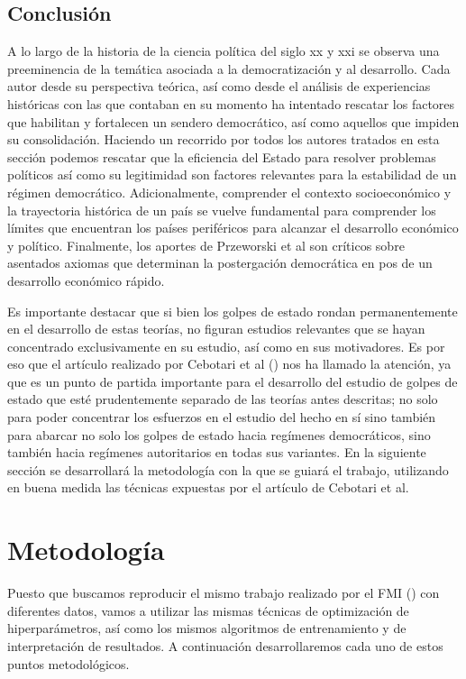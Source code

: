 \documentclass{article}
\begin{document}
\subsection{Conclusión}
A lo largo de la historia de la ciencia política del siglo xx y xxi se observa una
preeminencia de la temática asociada a la democratización y al desarrollo. Cada autor
desde su perspectiva teórica, así como desde el análisis de experiencias históricas con las 
que contaban en su momento ha intentado
rescatar los factores que habilitan y fortalecen un sendero democrático, así como aquellos
que impiden su consolidación. Haciendo un recorrido por todos los autores tratados en esta
sección podemos rescatar que la eficiencia del Estado para resolver problemas políticos así
como su legitimidad son factores relevantes para la estabilidad de un régimen democrático.
Adicionalmente, comprender el contexto socioeconómico y la trayectoria histórica de un país
se vuelve fundamental para comprender los límites que encuentran los países periféricos para
alcanzar el desarrollo económico y político. Finalmente, los aportes de Przeworski et al
son críticos sobre asentados axiomas que determinan la postergación democrática en pos de un 
desarrollo económico rápido.

Es importante destacar que si bien los golpes de estado rondan permanentemente
en el desarrollo de estas teorías, no figuran estudios relevantes que se hayan concentrado
exclusivamente en su estudio, así como en sus motivadores. Es por eso que el artículo
realizado por Cebotari et al (\citeyear{Ceb24}) nos ha llamado la atención, ya que es un
punto de partida importante para el desarrollo del estudio de golpes de estado que esté
prudentemente separado de las teorías antes descritas; no solo para poder concentrar los
esfuerzos en el estudio del hecho en sí sino también para abarcar no solo los golpes de
estado hacia regímenes democráticos, sino también hacia regímenes autoritarios en todas
sus variantes. En la siguiente sección se desarrollará la metodología con la que se guiará
el trabajo, utilizando en buena medida las técnicas expuestas por el artículo de Cebotari
et al.

\section{Metodología}
Puesto que buscamos reproducir el mismo trabajo realizado por el FMI (\cite{Ceb24}) 
con diferentes datos, vamos a utilizar las mismas técnicas de optimización de 
hiperparámetros, así como los mismos algoritmos de entrenamiento y de interpretación 
de resultados. A continuación desarrollaremos cada uno de estos puntos metodológicos.
\end{document}
